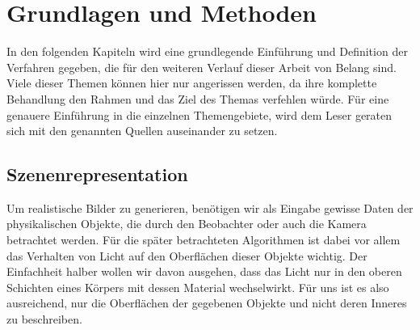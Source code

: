 \section{Grundlagen und Methoden} %
\label{sec:grundlagen_und_methoden}

	In den folgenden Kapiteln wird eine grundlegende Einführung und Definition der Verfahren gegeben, die für den weiteren Verlauf dieser Arbeit von Belang sind.
	Viele dieser Themen können hier nur angerissen werden, da ihre komplette Behandlung den Rahmen und das Ziel des Themas verfehlen würde.
	Für eine genauere Einführung in die einzelnen Themengebiete, wird dem Leser geraten sich mit den genannten Quellen auseinander zu setzen.

	\subsection{Szenenrepresentation} %
	\label{sec:szenenrepresentation}

		Um realistische Bilder zu generieren, benötigen wir als Eingabe gewisse Daten der physikalischen Objekte, die durch den Beobachter oder auch die Kamera betrachtet werden.
		Für die später betrachteten Algorithmen ist dabei vor allem das Verhalten von Licht auf den Oberflächen dieser Objekte wichtig.
		Der Einfachheit halber wollen wir davon ausgehen, dass das Licht nur in den oberen Schichten eines Körpers mit dessen Material wechselwirkt.
		Für uns ist es also ausreichend, nur die Oberflächen der gegebenen Objekte und nicht deren Inneres zu beschreiben.

